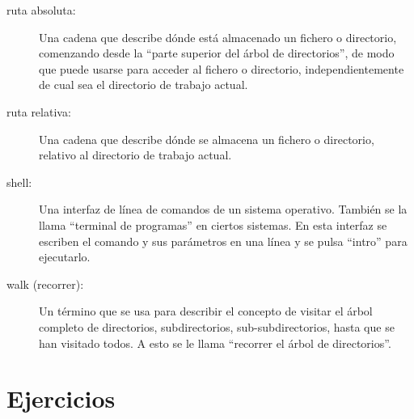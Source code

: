 \begin{description}
\item[ruta absoluta:] Una cadena que describe dónde está almacenado
un fichero o directorio, comenzando desde la ``parte superior del árbol de directorios'',
de modo que puede usarse para acceder al fichero o directorio, independientemente
de cual sea el directorio de trabajo actual.

\item[ruta relativa:] Una cadena que describe dónde se almacena
un fichero o directorio, relativo al directorio de trabajo
actual.

\item[shell:] Una interfaz de línea de comandos de un sistema operativo.
También se la llama ``terminal de programas'' en ciertos sistemas. En esta interfaz
se escriben el comando y sus parámetros en una línea y se pulsa ``intro''
para ejecutarlo.

\item[walk (recorrer):] Un término que se usa para describir el concepto de visitar
el árbol completo de directorios, subdirectorios, sub-subdirectorios,
hasta que se han visitado todos. A esto se le llama
``recorrer el árbol de directorios''.

\end{description}


\section{Ejercicios}

